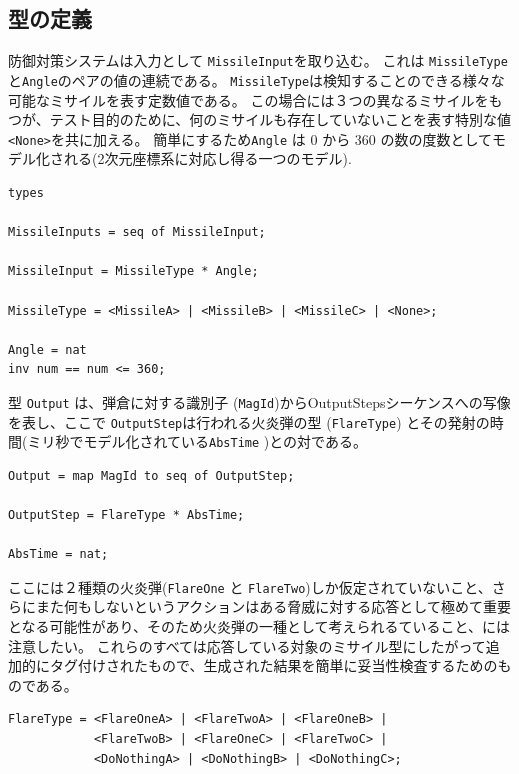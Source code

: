\documentclass[\pformat,12pt]{jreport}
\begin{document}
\subsection{型の定義}\label{subsec:generaltypes}

防御対策システムは入力として \texttt{MissileInput}を取り込む。
これは \texttt{MissileType} と\texttt{Angle}のペアの値の連続である。 
\texttt{MissileType}は検知することのできる様々な可能なミサイルを表す定数値である。
この場合には３つの異なるミサイルをもつが、テスト目的のために、何のミサイルも存在していないことを表す特別な値 \texttt{<None>}を共に加える。
簡単にするため\texttt{Angle} は 0 から 360 の数の度数としてモデル化される(2次元座標系に対応し得る一つのモデル).

\begin{lstlisting}
types
  
MissileInputs = seq of MissileInput;

MissileInput = MissileType * Angle;

MissileType = <MissileA> | <MissileB> | <MissileC> | <None>;

Angle = nat
inv num == num <= 360;
\end{lstlisting}

型 \texttt{Output} は、弾倉に対する識別子 (\texttt{MagId})からOutputStepsシーケンスへの写像を表し、ここで \texttt{OutputStep}は行われる火炎弾の型 (\texttt{FlareType}) とその発射の時間(ミリ秒でモデル化されている\texttt{AbsTime} )との対である。

\begin{lstlisting}
Output = map MagId to seq of OutputStep;

OutputStep = FlareType * AbsTime;

AbsTime = nat;
\end{lstlisting}

ここには２種類の火炎弾(\texttt{FlareOne} と \texttt{FlareTwo})しか仮定されていないこと、さらにまた何もしないというアクションはある脅威に対する応答として極めて重要となる可能性があり、そのため火炎弾の一種として考えられるていること、には注意したい。
これらのすべては応答している対象のミサイル型にしたがって追加的にタグ付けされたもので、生成された結果を簡単に妥当性検査するためのものである。

\begin{lstlisting}
FlareType = <FlareOneA> | <FlareTwoA> | <FlareOneB> |
            <FlareTwoB> | <FlareOneC> | <FlareTwoC> |
            <DoNothingA> | <DoNothingB> | <DoNothingC>;
\end{lstlisting}
\end{document}
